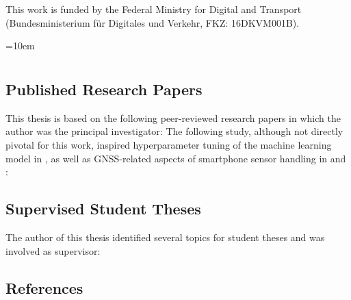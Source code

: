\documentclass[
  ngerman,english, %
  fontsize=12pt,twoside,BCOR=6mm, %
  numbers=noenddot, %
  cd=fullcolor,
  open=right,
  headings=heavy,
  chapterpage=true,
  cdfont=off, %
  sfdefaults=false,
]{tudscrmanual}
\begin{document}
This work is funded by the Federal Ministry for Digital and Transport (Bundesministerium für Digitales und Verkehr, FKZ: 16DKVM001B).
\vfill

\newpage

\tableofcontents


\nocite{matthes2022matching}
\nocite{matthes2023geo}
\nocite{matthes2023accurate}
\nocite{matthes2022selecting}

\nocite{lorenz_2022}
\nocite{pickhardt_2022}
\nocite{jeschor_2022}
\nocite{lahr_2023}
\nocite{pickhardt_2023}
\nocite{wieland_2023}
\nocite{pix_2024}








\newpage

\emergencystretch=10em

\chapter*{\bibname}

\section*{Published Research Papers}
This thesis is based on the following peer-reviewed research papers in which the author was the principal investigator:
\printbibliography[heading=none,nottype=student,keyword={ownpaper,related}]
The following study, although not directly pivotal for this work, inspired hyperparameter tuning of the machine learning model in , as well as GNSS-related aspects of smartphone sensor handling in  and :
\printbibliography[heading=none,notkeyword={student},keyword={ownpaper,notrelated}]
\vfill
\pagebreak

\section*{Supervised Student Theses}
The author of this thesis identified several topics for student theses and was involved as supervisor:
\printbibliography[heading=none,keyword={student},notkeyword={ownpaper}]
\vfill
\pagebreak

\section*{References}
\printbibliography[heading=none,notkeyword={student},notkeyword={ownpaper,notrelated},notkeyword={ownpaper,related}]
\vfill
\pagebreak

\newpage
\renewcommand{\glsnamefont}[1]{\color{cidarkblue} \textbf{#1} \dotfill}
\printunsrtglossary[type=abbreviations,title={Abbreviations}]
\end{document}
